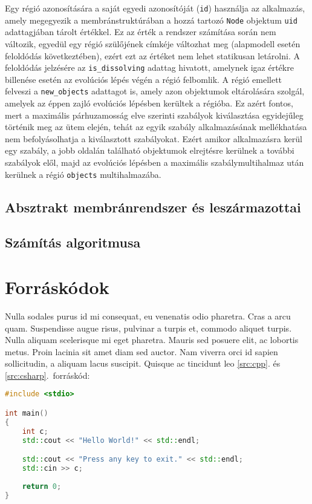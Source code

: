 Egy régió azonosítására a saját egyedi azonosítóját (\verb|id|) használja az alkalmazás, amely megegyezik a membránstruktúrában a hozzá tartozó \verb|Node| objektum \verb|uid| adattagjában tárolt értékkel. Ez az érték a rendszer számítása során nem változik, egyedül egy régió szülőjének címkéje változhat meg (alapmodell esetén feloldódás következtében), ezért ezt az értéket nem lehet statikusan letárolni. A feloldódás jelzésére az \verb|is_dissolving| adattag hivatott, amelynek igaz értékre billenése esetén az evolúciós lépés végén a régió felbomlik. A régió emellett felveszi a \verb|new_objects| adattagot is, amely azon objektumok eltárolására szolgál, amelyek az éppen zajló evolúciós lépésben kerültek a régióba. Ez azért fontos, mert a maximális párhuzamosság elve szerinti szabályok kiválasztása egyidejűleg történik meg az ütem elején, tehát az egyik szabály alkalmazásának mellékhatása nem befolyásolhatja a kiválasztott szabályokat. Ezért amikor alkalmazásra kerül egy szabály, a jobb oldalán található objektumok elrejtésre kerülnek a további szabályok elől, majd az evolúciós lépésben a maximális szabálymultihalmaz után kerülnek a régió \verb|objects| multihalmazába. 

\subsection{Absztrakt membránrendszer és leszármazottai}

\subsection{Számítás algoritmusa}

\section{Forráskódok}

Nulla sodales purus id mi consequat, eu venenatis odio pharetra. Cras a arcu quam. Suspendisse augue risus, pulvinar a turpis et, commodo aliquet turpis. Nulla aliquam scelerisque mi eget pharetra. Mauris sed posuere elit, ac lobortis metus. Proin lacinia sit amet diam sed auctor. Nam viverra orci id sapien sollicitudin, a aliquam lacus suscipit. Quisque ac tincidunt leo \ref{src:cpp}. és \ref{src:csharp}.~forráskód:

\begin{lstlisting}[language={C++}]
#include <stdio>

int main() 
{
	int c;
	std::cout << "Hello World!" << std::endl;

	std::cout << "Press any key to exit." << std::endl;
	std::cin >> c;
	
	return 0;
}
\end{lstlisting}

